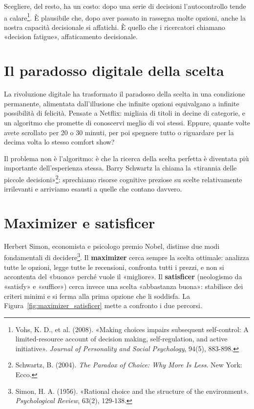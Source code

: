 Scegliere, del resto, ha un costo: dopo una serie di decisioni l'autocontrollo tende a calare\footnote{Vohs, K. D., et al. (2008). «Making choices impairs subsequent self-control: A limited-resource account of decision making, self-regulation, and active initiative». \textit{Journal of Personality and Social Psychology}, 94(5), 883-898.}. È plausibile che, dopo aver passato in rassegna molte opzioni, anche la nostra capacità decisionale si affatichi. È quello che i ricercatori chiamano «decision fatigue», affaticamento decisionale.

\section{Il paradosso digitale della scelta}

La rivoluzione digitale ha trasformato il paradosso della scelta in una condizione permanente, alimentata dall'illusione che infinite opzioni equivalgano a infinite possibilità di felicità. Pensate a Netflix: migliaia di titoli in decine di categorie, e un algoritmo che promette di conoscervi meglio di voi stessi. Eppure, quante volte avete scrollato per 20 o 30 minuti, per poi spegnere tutto o riguardare per la decima volta lo stesso comfort show?

Il problema non è l'algoritmo: è che la ricerca della scelta perfetta è diventata più importante dell'esperienza stessa. Barry Schwartz la chiama la «tirannia delle piccole decisioni»\footnote{Schwartz, B. (2004). \textit{The Paradox of Choice: Why More Is Less}. New York: Ecco.}: sprechiamo risorse cognitive preziose su scelte relativamente irrilevanti e arriviamo esausti a quelle che contano davvero.

\section{Maximizer e satisficer}

Herbert Simon, economista e psicologo premio Nobel, distinse due modi fondamentali di decidere\footnote{Simon, H. A. (1956). «Rational choice and the structure of the environment». \textit{Psychological Review}, 63(2), 129-138.}. Il \textbf{maximizer} cerca sempre la scelta ottimale: analizza tutte le opzioni, legge tutte le recensioni, confronta tutti i prezzi, e non si accontenta del «buono» perché vuole il «migliore». Il \textbf{satisficer} (neologismo da «satisfy» e «suffice») cerca invece una scelta «abbastanza buona»: stabilisce dei criteri minimi e si ferma alla prima opzione che li soddisfa. La Figura~\ref{fig:maximizer_satisficer} mette a confronto i due percorsi.

